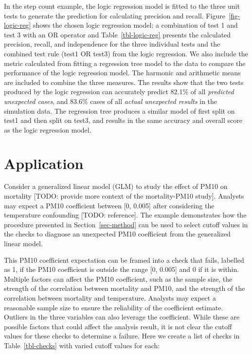 \documentclass[
  12pt,
]{interact}
\begin{document}
In the step count example, the logic regression model is fitted to the
three unit tests to generate the prediction for calculating precision
and recall. Figure~\ref{fig-logic-reg} shows the chosen logic regression
model: a combination of test 1 and test 3 with an OR operator and
Table~\ref{tbl-logic-reg} presents the calculated precision, recall, and
independence for the three individual tests and the combined test rule
(test1 OR test3) from the logic regression. We also include the metric
calculated from fitting a regression tree model to the data to compare
the performance of the logic regression model. The harmonic and
arithmetic means are included to combine the three measures. The results
show that the two tests produced by the logic regression can accurately
predict 82.1\% of all \emph{predicted unexpected cases}, and 83.6\%
cases of all \emph{actual unexpected results} in the simulation data.
The regression tree produces a similar model of first split on test1 and
then split on test3, and results in the same accuracy and overall score
as the logic regression model.

\section{Application}\label{sec-pm10-mortality}

Consider a generalized linear model (GLM) to study the effect of PM10 on
mortality {[}TODO: provide more context of the mortality-PM10 study{]}.
Analysts may expect a PM10 coefficient between {[}0, 0.005{]} after
considering the temperature confounding {[}TODO: reference{]}. The
example demonstrates how the procedure presented in
Section~\ref{sec-method} can be used to select cutoff values in the
checks to diagnose an unexpected PM10 coefficient from the generalized
linear model.

This PM10 coefficient expectation can be framed into a check that fails,
labelled as 1, if the PM10 coefficient is outside the range {[}0,
0.005{]} and 0 if it is within. Multiple factors can affect the PM10
coefficient, such as the sample size, the strength of the correlation
between mortality and PM10, and the strength of the correlation between
mortality and temperature. Analysts may expect a reasonable sample size
to ensure the reliability of the coefficient estimate. Outliers in the
three variables can also leverage the coefficient. While these are
possible factors that could affect the analysis result, it is not clear
the cutoff values for these checks to determine a failure. Here we
create a list of checks in Table~\ref{tbl-checks} with varied cutoff
values for each:
\end{document}
